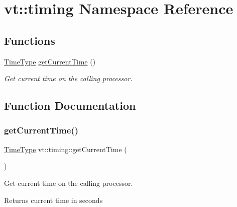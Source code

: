 \hypertarget{namespacevt_1_1timing}{}\section{vt\+:\+:timing Namespace Reference}
\label{namespacevt_1_1timing}
\subsection*{Functions}
\begin{DoxyCompactItemize}
\item 
\hyperlink{namespacevt_a876a9d0cd5a952859c72de8a46881442}{Time\+Type} \hyperlink{namespacevt_1_1timing_adb71f74fee337dab5a317e58e7d35b1d}{get\+Current\+Time} ()
\begin{DoxyCompactList}\small\item\em Get current time on the calling processor. \end{DoxyCompactList}\end{DoxyCompactItemize}


\subsection{Function Documentation}
\mbox{\label{namespacevt_1_1timing_adb71f74fee337dab5a317e58e7d35b1d}} 
\subsubsection{\texorpdfstring{get\+Current\+Time()}{getCurrentTime()}}
{\footnotesize\ttfamily \hyperlink{namespacevt_a876a9d0cd5a952859c72de8a46881442}{Time\+Type} vt\+::timing\+::get\+Current\+Time (\begin{DoxyParamCaption}{ }\end{DoxyParamCaption})}



Get current time on the calling processor. 

\begin{DoxyReturn}{Returns}
current time in seconds 
\end{DoxyReturn}
